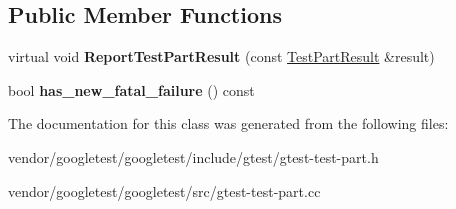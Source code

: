 \subsection*{Public Member Functions}
\begin{DoxyCompactItemize}
\item 
\mbox{\label{classtesting_1_1internal_1_1_has_new_fatal_failure_helper_a2d2e1faa1f3669b82810df97ac678a27}} 
virtual void {\bfseries Report\+Test\+Part\+Result} (const \mbox{\hyperlink{classtesting_1_1_test_part_result}{Test\+Part\+Result}} \&result)
\item 
\mbox{\label{classtesting_1_1internal_1_1_has_new_fatal_failure_helper_a91b7bac47f09076db4be0304a2110a9e}} 
bool {\bfseries has\+\_\+new\+\_\+fatal\+\_\+failure} () const
\end{DoxyCompactItemize}


The documentation for this class was generated from the following files\+:\begin{DoxyCompactItemize}
\item 
vendor/googletest/googletest/include/gtest/gtest-\/test-\/part.\+h\item 
vendor/googletest/googletest/src/gtest-\/test-\/part.\+cc\end{DoxyCompactItemize}
